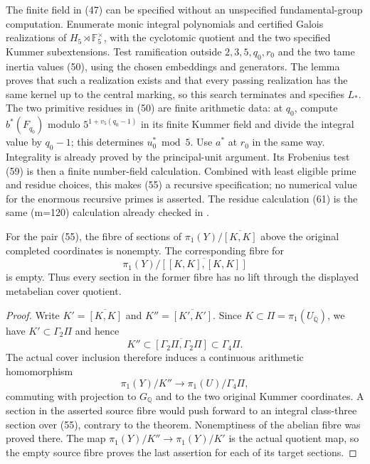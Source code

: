 The finite field in (47) can be specified without
an unspecified fundamental-group computation. Enumerate
monic integral polynomials and certified Galois
realizations of \(H_5\rtimes\mathbb F_5^\times\),
with the cyclotomic quotient and the two specified
Kummer subextensions. Test ramification outside
\(2,3,5,q_0,r_0\) and the two tame inertia values
(50), using the chosen embeddings and generators.
The lemma proves that such a realization exists and
that every passing realization has the same kernel
up to the central marking, so this search terminates
and specifies \(L_*\). The two primitive residues
in (50) are finite arithmetic data: at \(q_0\),
compute \(b^*(F_{q_0})\) modulo
\(5^{1+v_5(q_0-1)}\) in its finite Kummer field
and divide the integral value by \(q_0-1\);
this determines \(u_0^*\bmod5\). Use \(a^*\)
at \(r_0\) in the same way. Integrality is
already proved by the principal-unit argument.
Its Frobenius test (59) is
then a finite number-field calculation. Combined
with least eligible prime and residue choices,
this makes (55) a recursive specification; no
numerical value for the enormous recursive primes
is asserted. The residue calculation (61) is the
same (m=120) calculation already checked in
.

\begin{corollary}
\label{cor:ghost-metabelian-cover-exclusion}
For the pair (55), the fibre of sections of
\(\pi_1(Y)/\overline{[K,K]}\) above the original
completed coordinates is nonempty. The corresponding
fibre for
\[
 \pi_1(Y)/\overline{[[K,K],[K,K]]}
                                                        \tag{62}
\]
is empty. Thus every section in the former fibre
has no lift through the displayed metabelian
cover quotient.
\end{corollary}
\begin{proof}
Write \(K'=\overline{[K,K]}\) and
\(K''=\overline{[K',K']}\). Since
\(K\subset\Pi=\pi_1(U_{\overline{\mathbb Q}})\),
we have \(K'\subset\Gamma_2\Pi\) and hence
\[
 K''\subset\overline{[\Gamma_2\Pi,\Gamma_2\Pi]}
                     \subset\Gamma_4\Pi.
\]
The actual cover inclusion therefore induces a
continuous arithmetic homomorphism
\[
 \pi_1(Y)/K''\longrightarrow\pi_1(U)/\Gamma_4\Pi,
                                                        \tag{63}
\]
commuting with projection to \(G_{\mathbb Q}\)
and to the two original Kummer coordinates.
A section in the asserted source fibre would push
forward to an integral class-three section over
(55), contrary to the theorem. Nonemptiness of
the abelian fibre was proved there. The map
\(\pi_1(Y)/K''\to\pi_1(Y)/K'\) is the actual
quotient map, so the empty source fibre proves
the last assertion for each of its target sections.
\end{proof}
